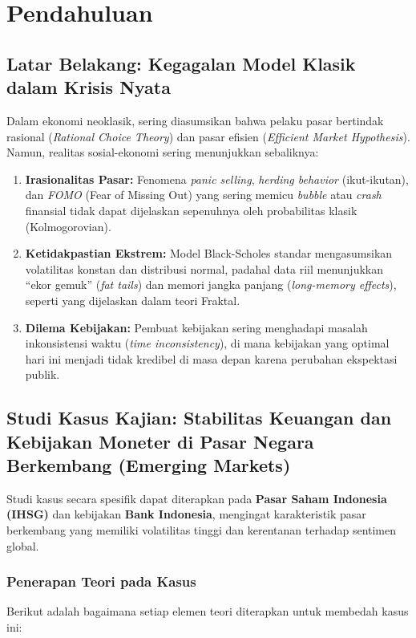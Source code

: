 \section{Pendahuluan}

\subsection{Latar Belakang: Kegagalan Model Klasik dalam Krisis Nyata}

Dalam ekonomi neoklasik, sering diasumsikan bahwa pelaku pasar bertindak rasional (\textit{Rational Choice Theory}) dan pasar efisien (\textit{Efficient Market Hypothesis}). Namun, realitas sosial-ekonomi sering menunjukkan sebaliknya:
\begin{enumerate}
    \item \textbf{Irasionalitas Pasar:} Fenomena \textit{panic selling}, \textit{herding behavior} (ikut-ikutan), dan \textit{FOMO} (Fear of Missing Out) yang sering memicu \textit{bubble} atau \textit{crash} finansial tidak dapat dijelaskan sepenuhnya oleh probabilitas klasik (Kolmogorovian).
    \item \textbf{Ketidakpastian Ekstrem:} Model Black-Scholes standar mengasumsikan volatilitas konstan dan distribusi normal, padahal data riil menunjukkan ``ekor gemuk'' (\textit{fat tails}) dan memori jangka panjang (\textit{long-memory effects}), seperti yang dijelaskan dalam teori Fraktal.
    \item \textbf{Dilema Kebijakan:} Pembuat kebijakan sering menghadapi masalah inkonsistensi waktu (\textit{time inconsistency}), di mana kebijakan yang optimal hari ini menjadi tidak kredibel di masa depan karena perubahan ekspektasi publik.
\end{enumerate}

\subsection{Studi Kasus Kajian: Stabilitas Keuangan dan Kebijakan Moneter di Pasar Negara Berkembang (Emerging Markets)}

Studi kasus secara spesifik dapat diterapkan pada \textbf{Pasar Saham Indonesia (IHSG)} dan kebijakan \textbf{Bank Indonesia}, mengingat karakteristik pasar berkembang yang memiliki volatilitas tinggi dan kerentanan terhadap sentimen global.

\subsubsection{Penerapan Teori pada Kasus}
Berikut adalah bagaimana setiap elemen teori diterapkan untuk membedah kasus ini:

